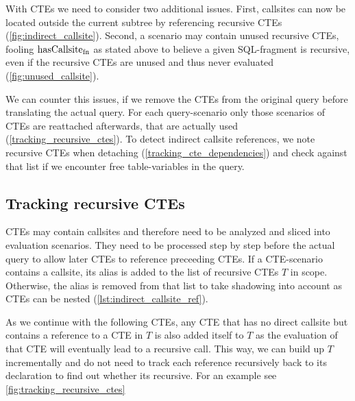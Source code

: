 With CTEs we need to consider two additional issues. First, callsites can now be located outside the current subtree by referencing recursive CTEs (\autoref{fig:indirect_callsite}). Second, a scenario may contain unused recursive CTEs, fooling $\operatorname{\text{hasCallsite}_{fn}}$ as stated above to believe a given SQL-fragment is recursive, even if the recursive CTEs are unused and thus never evaluated (\autoref{fig:unused_callsite}).

We can counter this issues, if we remove the CTEs from the original query before translating the actual query. For each query-scenario only those scenarios of CTEs are reattached afterwards, that are actually used (\autoref{tracking_recursive_ctes}). To detect indirect callsite references, we note recursive CTEs when detaching (\autoref{tracking_cte_dependencies}) and check against that list if we encounter free table-variables in the query.

\subsection{Tracking recursive CTEs}\label{tracking_recursive_ctes}

CTEs may contain callsites and therefore need to be analyzed and sliced into evaluation scenarios. They need to be processed step by step before the actual query to allow later CTEs to reference preceeding CTEs. If a CTE-scenario contains a callsite, its alias is added to the list of recursive CTEs $T$ in scope. Otherwise, the alias is removed from that list to take shadowing into account as CTEs can be nested (\autoref{lst:indirect_callsite_ref}).

As we continue with the following CTEs, any CTE that has no direct callsite but contains a reference to a CTE in $T$ is also added itself to $T$ as the evaluation of that CTE will eventually lead to a recursive call. This way, we can build up $T$ incrementally and do not need to track each reference recursively back to its declaration to find out whether its recursive. For an example see \autoref{fig:tracking_recursive_ctes}

